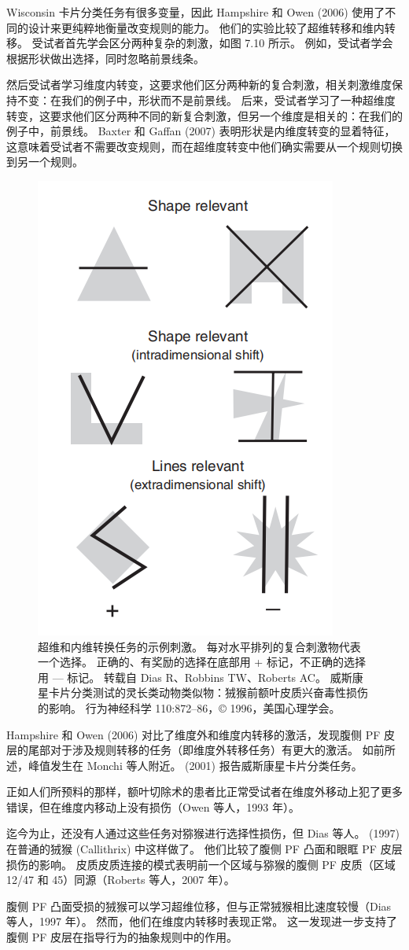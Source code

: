 \par
Wisconsin 卡片分类任务有很多变量，因此 Hampshire 和 Owen (2006) 使用了不同的设计来更纯粹地衡量改变规则的能力。 他们的实验比较了超维转移和维内转移。 受试者首先学会区分两种复杂的刺激，如图 7.10 所示。 例如，受试者学会根据形状做出选择，同时忽略前景线条。
\par
  然后受试者学习维度内转变，这要求他们区分两种新的复合刺激，相关刺激维度保持不变：在我们的例子中，形状而不是前景线。 后来，受试者学习了一种超维度转变，这要求他们区分两种不同的新复合刺激，但另一个维度是相关的：在我们的例子中，前景线。 Baxter 和 Gaffan (2007) 表明形状是内维度转变的显着特征，这意味着受试者不需要改变规则，而在超维度转变中他们确实需要从一个规则切换到另一个规则。
  \begin{figure}
  	\centering
  	\includegraphics[width=0.6\linewidth]{image_pfc/Fig_7_10}
  	\caption{超维和内维转换任务的示例刺激。 
  		每对水平排列的复合刺激物代表一个选择。 
  		正确的、有奖励的选择在底部用 + 标记，不正确的选择用 — 标记。
  		转载自 Dias R、Robbins TW、Roberts AC。 
  		威斯康星卡片分类测试的灵长类动物类似物：狨猴前额叶皮质兴奋毒性损伤的影响。 
  		行为神经科学 110:872–86，© 1996，美国心理学会。}
  	\label{fig:fig}
  \end{figure}
\par
  Hampshire 和 Owen (2006) 对比了维度外和维度内转移的激活，发现腹侧 PF 皮层的尾部对于涉及规则转移的任务（即维度外转移任务）有更大的激活。 如前所述，峰值发生在 Monchi 等人附近。 (2001) 报告威斯康星卡片分类任务。
\par
正如人们所预料的那样，额叶切除术的患者比正常受试者在维度外移动上犯了更多错误，但在维度内移动上没有损伤（Owen 等人，1993 年）。
\par
迄今为止，还没有人通过这些任务对猕猴进行选择性损伤，但 Dias 等人。 (1997) 在普通的狨猴 (Callithrix) 中这样做了。 他们比较了腹侧 PF 凸面和眼眶 PF 皮层损伤的影响。 皮质皮质连接的模式表明前一个区域与猕猴的腹侧 PF 皮质（区域 12/47 和 45）同源（Roberts 等人，2007 年）。
\par
腹侧 PF 凸面受损的狨猴可以学习超维位移，但与正常狨猴相比速度较慢（Dias 等人，1997 年）。 然而，他们在维度内转移时表现正常。 这一发现进一步支持了腹侧 PF 皮层在指导行为的抽象规则中的作用。

